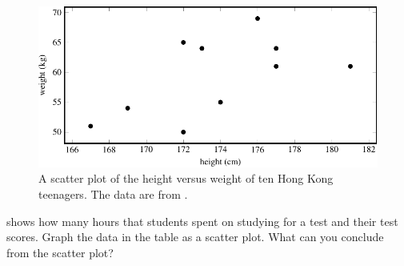 \documentclass[a4paper,oneside,12pt]{article}
\begin{document}
\begin{figure}[!htbp]
\centering
\includegraphics[scale=1]{image/07/height-weight-scatterplot.pdf}
\caption{%
  A scatter plot of the height versus weight of ten Hong Kong
  teenagers.  The data are from .
}
\label{fig:height_weight_scatterplot}
\end{figure}

\begin{table}[!htbp]
\centering

\caption{%
  The number of hours that eleven students spent on studying for a
  test versus their test scores.  The test is marked out of ten.
}
\label{tab:test_score}
\end{table}

\begin{exercise}
 shows how many hours that students spent on
studying for a test and their test scores.  Graph the data in the
table as a scatter plot.  What can you conclude from the scatter plot?
\end{exercise}
\end{document}
